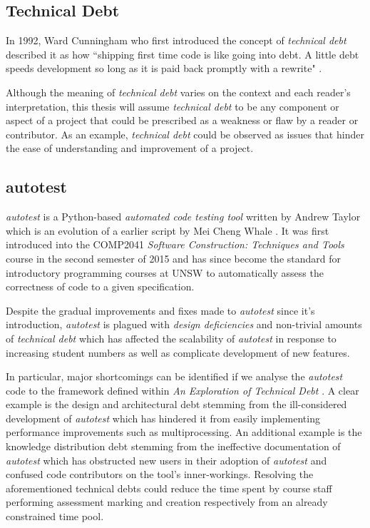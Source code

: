 \documentclass[hidelinks]{report}
\begin{document}
\subsection{Technical Debt}
In 1992, Ward Cunningham who first introduced the concept of \textit{technical debt} described it as how ``shipping first time code is like going into debt. A little debt speeds development so long as it is paid back promptly with a rewrite" \cite{TechnicalDebtConcept}.

Although the meaning of \textit{technical debt} varies on the context and each reader's interpretation, this thesis will assume \textit{technical debt} to be any component or aspect of a project that could be prescribed as a weakness or flaw by a reader or contributor. As an example, \textit{technical debt} could be observed as issues that hinder the ease of understanding and improvement of a project. 

\subsection{autotest}
\textit{autotest} is a Python-based \textit{automated code testing tool} written by Andrew Taylor which is an evolution of a earlier script by Mei Cheng Whale \cite{Autotest}. It was first introduced into the COMP2041 \textit{Software Construction: Techniques and Tools} course in the second semester of 2015 and has since become the standard for introductory programming courses at UNSW to automatically assess the correctness of code to a given specification.

Despite the gradual improvements and fixes made to \textit{autotest} since it's introduction, \textit{autotest} is plagued with \textit{design deficiencies} and non-trivial amounts of \textit{technical debt} which has affected the scalability of \textit{autotest} in response to increasing student numbers as well as complicate development of new features.

In particular, major shortcomings can be identified if we analyse the \textit{autotest} code to the framework defined within \textit{An Exploration of Technical Debt} \cite{TechnicalDebt}. A clear example is the design and architectural debt stemming from the ill-considered development of \textit{autotest} which has hindered it from easily implementing performance improvements such as multiprocessing. An additional example is the knowledge distribution debt stemming from the ineffective documentation of \textit{autotest} which has obstructed new users in their adoption of \textit{autotest} and confused code contributors on the tool's inner-workings. Resolving the aforementioned technical debts could reduce the time spent by course staff performing assessment marking and creation respectively from an already constrained time pool.
\end{document}
